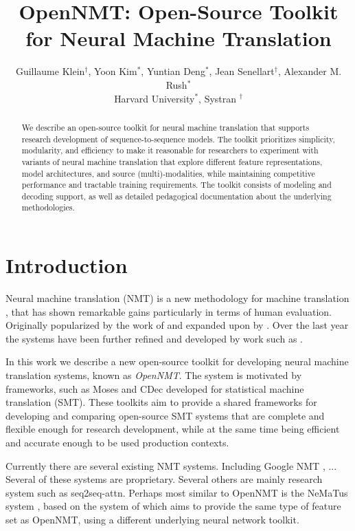 \documentclass[11pt]{article}
\title{OpenNMT: Open-Source Toolkit for Neural Machine Translation}
\author{Guillaume Klein$^\dagger$, Yoon Kim$^*$, Yuntian Deng$^*$, Jean Senellart$^\dagger$, Alexander M. Rush$^*$ \\ Harvard University$^*$, Systran $^\dagger$}
\date{}
\begin{document}
\maketitle
\begin{abstract}

  We describe an open-source toolkit for neural machine translation
  that supports research development of sequence-to-sequence models.
  The toolkit prioritizes simplicity, modularity, and efficiency to
  make it reasonable for researchers to experiment with variants of
  neural machine translation that explore different feature
  representations, model architectures, and source (multi)-modalities,
  while maintaining competitive performance and tractable training
  requirements. The toolkit consists of modeling and decoding support,
  as well as detailed pedagogical documentation about the underlying
  methodologies.

\end{abstract}

\section{Introduction}


Neural machine translation (NMT) is a new methodology for machine
translation \cite{}, that has shown remarkable gains particularly in
terms of human evaluation. Originally popularized by the work of
\cite{} and expanded upon by \cite{}. Over the last year the systems
have been further refined and developed by work such as \cite{}.

In this work we describe a new open-source toolkit for developing
neural machine translation systems, known as \textit{OpenNMT}. The
system is motivated by frameworks, such as Moses and CDec developed
for statistical machine translation (SMT). These toolkits aim to
provide a shared frameworks for developing and comparing open-source
SMT systems that are complete and flexible enough for research
development, while at the same time being efficient and accurate
enough to be used production contexts. 


Currently there are several existing NMT systems. Including Google NMT
\cite{}, ... Several of these systems are proprietary. Several others
are mainly research system such as seq2seq-attn. Perhaps most similar
to OpenNMT is the NeMaTus system \cite{}, based on the system of \cite{}
which aims to provide the same type of feature set as OpenNMT, using a
different underlying neural network toolkit.
\end{document}
